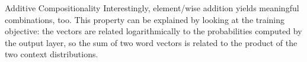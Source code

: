 \documentclass[usepdftitle=false]{beamer}
\theoremstyle{definition}
\begin{document}
\begin{frame}{Additive Compositionality}
  Interestingly, element\-/wise addition yields meaningful
  combinations, too.  This property can be explained by looking at the
  training objective: the vectors are related logarithmically to the
  probabilities computed by the output layer, so the sum of two word
  vectors is related to the product of the two context distributions.
  \begin{table}
    \centering
    \caption{Additive compositionality showing the \num{4} closest vectors.}
  \end{table}
\end{frame}
\end{document}
